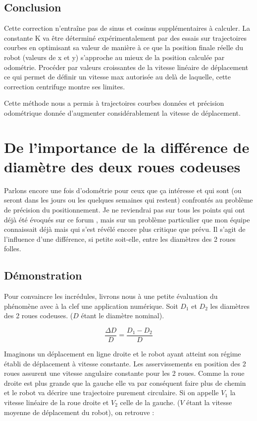\documentclass[a4paper]{report}
\begin{document}
\section{Conclusion}
Cette correction n'entraîne pas de sinus et cosinus supplémentaires à calculer.
La constante K va être déterminé expérimentalement par des essais sur trajectoires courbes en optimisant sa valeur de manière à ce que la position finale réelle du robot (valeurs de x et y) s'approche au mieux de la position calculée par odométrie.
Procéder par valeurs croissantes de la vitesse linéaire de déplacement ce qui permet de définir un vitesse max autorisée au delà de laquelle, cette correction centrifuge montre ses limites.

Cette méthode nous a permis à trajectoires courbes données et précision odométrique donnée d'augmenter considérablement la vitesse de déplacement.

\chapter{De l'importance de la différence de diamètre des deux roues codeuses}
Parlons encore une fois d’odométrie pour ceux que ça intéresse et qui sont (ou seront dans les jours ou les quelques semaines qui restent) confrontés au problème de précision du positionnement.
Je ne reviendrai pas sur tous les points qui ont déjà été évoqués sur ce forum , mais sur un problème particulier que mon équipe connaissait déjà mais qui s’est révélé encore plus critique que prévu. Il s’agit de l’influence d’une différence, si petite soit-elle, entre les diamètres des 2 roues folles.

\section{Démonstration}
Pour convaincre les incrédules, livrons nous à une petite évaluation du phénomène avec à la clef une application numérique.
Soit $D_1$ et $D_2$ les diamètres des 2 roues codeuses. ($D$ étant le diamètre nominal).

\begin{equation}
\frac{\Delta D}{D} = \frac{D_1-D_2}{D}
\end{equation}

Imaginons un déplacement en ligne droite et le robot ayant atteint son régime établi de déplacement à vitesse constante.
Les asservissements en position des 2 roues assurent une vitesse angulaire constante pour les 2 roues. Comme la roue droite est plus grande que la gauche elle va par conséquent faire plus de chemin et le robot va décrire une trajectoire purement circulaire. 
Si on appelle $V_1$ la vitesse linéaire de la roue droite et $V_2$ celle de la gauche.
($V$ étant la vitesse moyenne de déplacement du robot), on retrouve :
\end{document}
